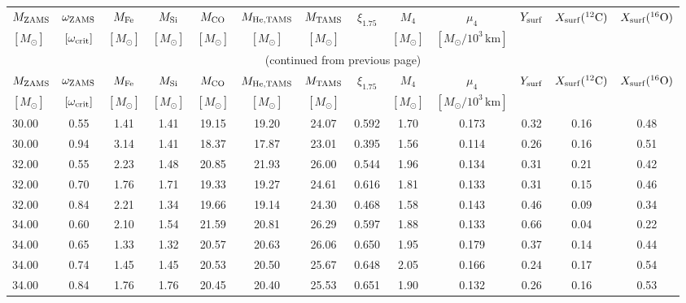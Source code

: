 \begin{longtable}{lc|cccc|cc|cc|ccc}
\hline
$M_{\rm ZAMS}$ & $\omega_{\rm ZAMS}$ & $M_{\rm Fe}$ & $M_{\rm Si}$ & $M_{\rm CO}$ & $M_{\rm He, TAMS}$ & $M_{\rm TAMS}$ & \multirow{2}{*}{$\xi_{1.75}$} & $M_{4}$ & $\mu_{4}$ & \multirow{2}{*}{$Y_{\rm surf}$} & \multirow{2}{*}{$X_{\rm surf}(^{12}\mathrm{C})$} & \multirow{2}{*}{$X_{\rm surf}(^{16}\mathrm{O})$} \\
$[M_{\odot}]$ & $[\omega_{\rm crit}]$ &  $[M_{\odot}]$ & $[M_{\odot}]$ & $[M_{\odot}]$ & $[M_{\odot}]$ & $[M_{\odot}]$ &  & $[M_{\odot}]$ & $[M_{\odot}/10^{3}\,\mathrm{km}]$ & & & \\
  \hline
  \hline
  \endfirsthead
  \hline
  \multicolumn{13}{c}{(continued from previous page)}\\
  \hline
  \hline
$M_{\rm ZAMS}$ & $\omega_{\rm ZAMS}$ & $M_{\rm Fe}$ & $M_{\rm Si}$ & $M_{\rm CO}$ & $M_{\rm He, TAMS}$ & $M_{\rm TAMS}$ & \multirow{2}{*}{$\xi_{1.75}$} & $M_{4}$ & $\mu_{4}$ & \multirow{2}{*}{$Y_{\rm surf}$} & \multirow{2}{*}{$X_{\rm surf}(^{12}\mathrm{C})$} & \multirow{2}{*}{$X_{\rm surf}(^{16}\mathrm{O})$} \\
$[M_{\odot}]$ & $[\omega_{\rm crit}]$ &  $[M_{\odot}]$ & $[M_{\odot}]$ & $[M_{\odot}]$ & $[M_{\odot}]$ & $[M_{\odot}]$ &  & $[M_{\odot}]$ & $[M_{\odot}/10^{3}\,\mathrm{km}]$ & & & \\
  \hline
  \hline
  \endhead
\hline
30.00 & 0.55 & 1.41 & 1.41 & 19.15 & 19.20 & 24.07 & 0.592 & 1.70 & 0.173 & 0.32 & 0.16 & 0.48\\
30.00 & 0.94 & 3.14 & 1.41 & 18.37 & 17.87 & 23.01 & 0.395 & 1.56 & 0.114 & 0.26 & 0.16 & 0.51\\
\hline
32.00 & 0.55 & 2.23 & 1.48 & 20.85 & 21.93 & 26.00 & 0.544 & 1.96 & 0.134 & 0.31 & 0.21 & 0.42\\
32.00 & 0.70 & 1.76 & 1.71 & 19.33 & 19.27 & 24.61 & 0.616 & 1.81 & 0.133 & 0.31 & 0.15 & 0.46\\
32.00 & 0.84 & 2.21 & 1.34 & 19.66 & 19.14 & 24.30 & 0.468 & 1.58 & 0.143 & 0.46 & 0.09 & 0.34\\
\hline
34.00 & 0.60 & 2.10 & 1.54 & 21.59 & 20.81 & 26.29 & 0.597 & 1.88 & 0.133 & 0.66 & 0.04 & 0.22\\
34.00 & 0.65 & 1.33 & 1.32 & 20.57 & 20.63 & 26.06 & 0.650 & 1.95 & 0.179 & 0.37 & 0.14 & 0.44\\
34.00 & 0.74 & 1.45 & 1.45 & 20.53 & 20.50 & 25.67 & 0.648 & 2.05 & 0.166 & 0.24 & 0.17 & 0.54\\
34.00 & 0.84 & 1.76 & 1.76 & 20.45 & 20.40 & 25.53 & 0.651 & 1.90 & 0.132 & 0.26 & 0.16 & 0.53\\

\end{longtable}

